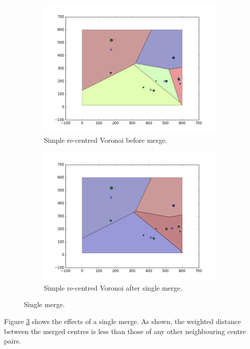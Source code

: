 \begin{figure}[H]
\begin{subfigure}[b]{0.5\textwidth}
  \includegraphics[width=\textwidth]{Images/1merge1.png}
  \caption{Simple re-centred Voronoi before merge.}
  \label{fig:1merge1}
\end{subfigure}
\hfill
\begin{subfigure}[b]{0.5\textwidth}
  \includegraphics[width=\textwidth]{Images/1merge2.png}
  \caption{Simple re-centred Voronoi after single merge.}
  \label{fig:1merge2}
\end{subfigure}
\caption{Single merge.}
\label{fig:1merge}
\end{figure}
Figure \ref{fig:1merge} shows the effects of a single merge. As shown, the weighted distance between the merged centres is less than those of any other neighbouring centre pairs.
